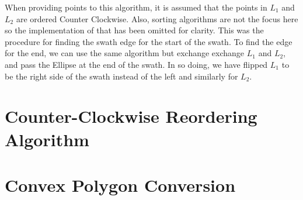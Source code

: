 When providing points to this algorithm, it is assumed that the points in $L_1$
and $L_2$ are ordered Counter Clockwise. Also, sorting algorithms are not the
focus here so the implementation of that has been omitted for clarity. This was
the procedure for finding the swath edge for the start of the swath. To find
the edge for the end, we can use the same algorithm but exchange exchange $L_1$
and $L_2$, and pass the Ellipse at the end of the swath. In so doing, we have
flipped $L_1$ to be the right side of the swath instead of the left and
similarly for $L_2$. 




\section{Counter-Clockwise Reordering Algorithm} \label{alg:ccw}


\section{Convex Polygon Conversion} \label{alg:force-complex}

